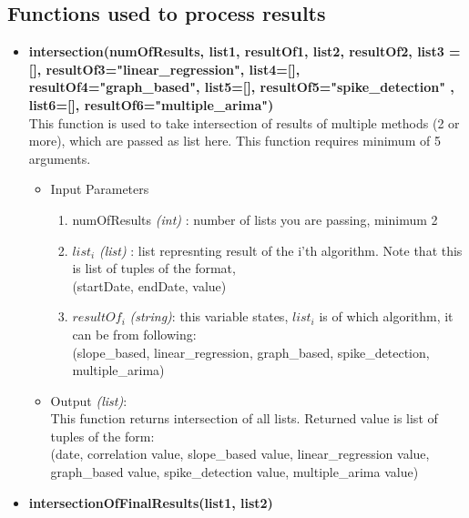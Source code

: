 \subsection{Functions used to process results}

\begin{itemize}
   
   
   \item \textbf{intersection(numOfResults, list1, resultOf1, list2, resultOf2, list3 = 
[], resultOf3="linear\_regression", list4=[], resultOf4="graph\_based", 
list5=[], resultOf5="spike\_detection" , list6=[], resultOf6="multiple\_arima") }
\\
  This function is used to take intersection of results of multiple methods (2 
or more), which are passed as list here. This function requires minimum of 5 
arguments. 
   
   \begin{itemize}
 \item Input Parameters
 
 \begin{enumerate}
  \item numOfResults \textit{(int)} : number of lists you are passing, minimum 2
  \item $list_i$ \textit{(list)} : list represnting result of the i'th 
algorithm. Note that this is list of tuples of the format, \\
  (startDate, endDate, value)
  \item $resultOf_i$ \textit{(string)}: this variable states, $list_i$ is of 
which algorithm, it can be from following: \\
            (slope\_based, linear\_regression, graph\_based, spike\_detection, 
multiple\_arima)

 \end{enumerate}

 \item Output \textit{(list)}: \\
 This function returns intersection of all lists. Returned value is list of 
tuples of the form: \\
 (date, correlation value, slope\_based value, linear\_regression value, 
graph\_based value, spike\_detection value, multiple\_arima value)

 \end{itemize}
   
   
   
   
   \item \textbf{intersectionOfFinalResults(list1, list2)} \\
  

\end{itemize}
